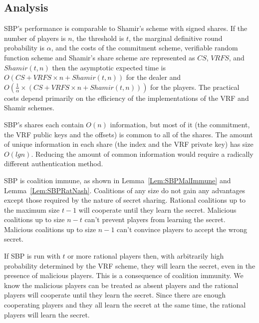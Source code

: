 \documentclass[12pt]{dalcsthesis}
\begin{document}
\subsection{Analysis}

SBP's performance is comparable to Shamir's scheme with signed shares. If the number of players is $n$, the threshold is $t$, the marginal definitive round probability is $\alpha$, and the costs of the commitment scheme, verifiable random function scheme and Shamir's share scheme are represented as $CS$, $VRFS$, and $Shamir(t, n)$ then the asymptotic expected time is $O(CS + VRFS \times n + Shamir(t, n))$ for the dealer and $O(\frac{1}{\alpha} \times (CS + VRFS \times n + Shamir(t, n)))$ for the players. The practical costs depend primarily on the efficiency of the implementations of the VRF and Shamir schemes.

SBP's shares each contain $O(n)$ information, but most of it (the commitment, the VRF public keys and the offsets) is common to all of the shares. The amount of unique information in each share (the index and the VRF private key) has size $O(lg n)$. Reducing the amount of common information would require a radically different authentication method.

SBP is coalition immune, as shown in Lemma~\ref{Lem:SBPMalImmune} and Lemma~\ref{Lem:SBPRatNash}. Coalitions of any size do not gain any advantages except those required by the nature of secret sharing. Rational coalitions up to the maximum size $t-1$ will cooperate until they learn the secret. Malicious coalitions up to size $n-t$ can't prevent players from learning the secret. Malicious coalitions up to size $n-1$ can't convince players to accept the wrong secret.

If SBP is run with $t$ or more rational players then, with arbitrarily high probability determined by the VRF scheme, they will learn the secret, even in the presence of malicious players. This is a consequence of coalition immunity. We know the malicious players can be treated as absent players and the rational players will cooperate until they learn the secret. Since there are enough cooperating players and they all learn the secret at the same time, the rational players will learn the secret.
\end{document}
